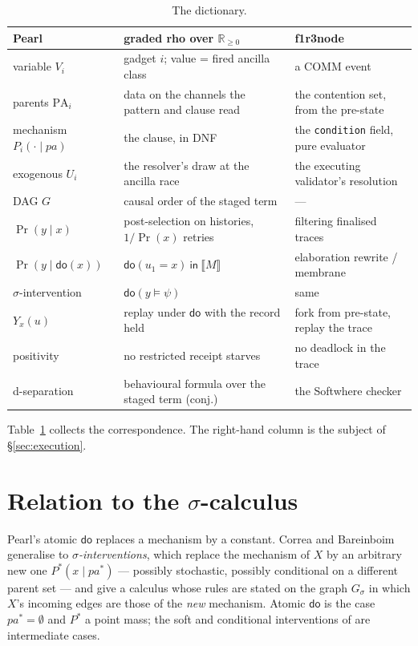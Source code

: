 \documentclass[11pt,a4paper]{article}
\theoremstyle{plain}
\theoremstyle{definition}
\theoremstyle{remark}
\newcommand{\rhoc}{\textsf{rho}}
\newcommand{\sem}[1]{\llbracket #1 \rrbracket}
\newcommand{\Rnn}{\mathbb{R}_{\geq 0}}
\newcommand{\dok}{\textsf{do}}
\newcommand{\ink}{\textsf{in}}
\newcommand{\PA}{\mathrm{PA}}
\begin{document}
\begin{table}[t]
\centering\small
\begin{tabular}{@{}>{\raggedright\arraybackslash}p{}>{\raggedright\arraybackslash}p{}>{\raggedright\arraybackslash}p{}@{}}
\toprule
\textbf{Pearl} & \textbf{graded \rhoc{} over $\Rnn$} & \textbf{f1r3node}\\
\midrule
variable $V_i$ & gadget $i$; value = fired ancilla class & a COMM event\\
parents $\PA_i$ & data on the channels the pattern and clause read & the contention set, from the pre-state\\
mechanism $P_i(\cdot\mid\mathit{pa})$ & the clause, in DNF & the \texttt{condition} field, pure evaluator\\
exogenous $U_i$ & the resolver's draw at the ancilla race & the executing validator's resolution\\
DAG $G$ & causal order of the staged term & --- \\
$\Pr(y \mid x)$ & post-selection on histories, $1/\Pr(x)$ retries & filtering finalised traces\\
$\Pr(y \mid \dok(x))$ & $\dok(u_1 = x)\ \ink\ \sem{M}$ & elaboration rewrite / membrane\\
$\sigma$-intervention & $\dok(y \models \psi)$ & same\\
$Y_x(u)$ & replay under $\dok$ with the record held & fork from pre-state, replay the trace\\
positivity & no restricted receipt starves & no deadlock in the trace\\
d-separation & behavioural formula over the staged term (conj.) & the Softwhere checker\\
\bottomrule
\end{tabular}
\caption{The dictionary.}\label{tab:dictionary}
\end{table}

Table~\ref{tab:dictionary} collects the correspondence. The right-hand column
is the subject of \S\ref{sec:execution}.

\section{Relation to the $\sigma$-calculus}\label{sec:sigma}

Pearl's atomic $\dok$ replaces a mechanism by a constant. Correa and Bareinboim
\cite{CorreaBareinboim} generalise to \emph{$\sigma$-interventions}, which
replace the mechanism of $X$ by an arbitrary new one $P^*(x \mid \mathit{pa}^*)$
--- possibly stochastic, possibly conditional on a different parent set --- and
give a calculus whose rules are stated on the graph $G_\sigma$ in which $X$'s
incoming edges are those of the \emph{new} mechanism. Atomic $\dok$ is the case
$\mathit{pa}^* = \emptyset$ and $P^*$ a point mass; the soft and conditional
interventions of \cite{EberhardtScheines} are intermediate cases.
\end{document}
